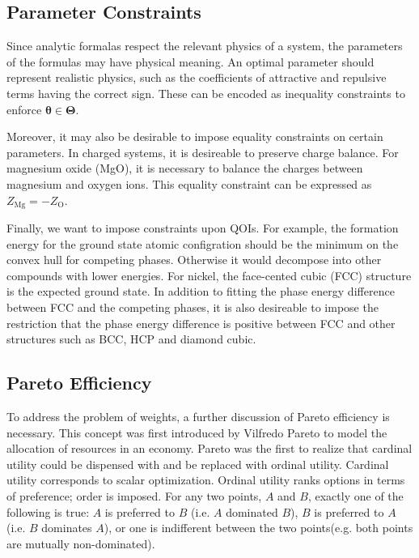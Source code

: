 \subsection{Parameter Constraints}

Since analytic formalas respect the relevant physics of a system, the parameters of the formulas may have physical meaning.  An optimal parameter should represent realistic physics, such as the coefficients of attractive and repulsive terms having the correct sign.  These can be encoded as inequality constraints to enforce $\bm{\theta} \in \bm{\Theta}$.

Moreover, it may also be desirable to impose equality constraints on certain parameters.  In charged systems, it is desireable to preserve charge balance.  For magnesium oxide (MgO), it is necessary to balance the charges between magnesium and oxygen ions.  This equality constraint can be expressed as $Z_{\text{Mg}} = -Z_{\text{O}}$.

Finally, we want to impose constraints upon QOIs.  For example, the formation energy for the ground state atomic configration should be the minimum on the convex hull for competing phases.  Otherwise it would decompose into other compounds with lower energies.  For nickel, the face-cented cubic (FCC) structure is the expected ground state.  In addition to fitting the phase energy difference between FCC and the competing phases, it is also desireable to impose the restriction that the phase energy difference is positive between FCC and other structures such as BCC, HCP and diamond cubic.

\subsection{Pareto Efficiency}
\label{sec:pareto_efficiency}

To address the problem of weights, a further discussion of Pareto efficiency is necessary. This concept was first introduced by Vilfredo Pareto to model the allocation of resources in an economy\cite{pareto1897_pareto}.  Pareto was the first to realize that cardinal utility could be dispensed with and be replaced with ordinal utility\cite{aspers2001_pareto}.  Cardinal utility corresponds to scalar optimization.  Ordinal utility ranks options in terms of preference; order is imposed.  For any two points, $A$ and $B$, exactly one of the following is true: $A$ is preferred to $B$ (i.e. $A$ dominated $B$), $B$ is preferred to $A$ (i.e. $B$ dominates $A$), or one is indifferent between the two points(e.g. both points are mutually non-dominated).

